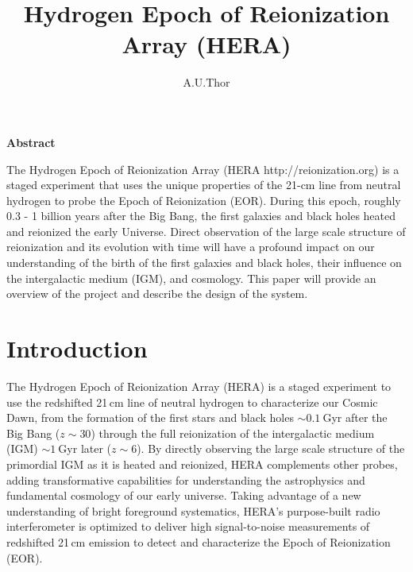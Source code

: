 \documentclass[preprint,11pt]{aastex}
\title{Hydrogen Epoch of Reionization Array (HERA)}
\author{A.U.Thor}
\begin{document}
\maketitle

\begin{center}
\textbf{Abstract}
\end{center}

The Hydrogen Epoch of Reionization Array (HERA http://reionization.org) is a staged experiment that uses the unique properties of the 21-cm line from neutral hydrogen to probe the Epoch of Reionization (EOR). During this epoch, roughly 0.3 - 1 billion years after the Big Bang, the first galaxies and black holes heated and reionized the early Universe. Direct observation of the large scale structure of reionization and its evolution with time will have a profound impact on our understanding of the birth of the first galaxies and black holes, their influence on the intergalactic medium (IGM), and cosmology.  This paper will provide an overview of the project and describe the design of the system.

\section{Introduction}
The Hydrogen Epoch of Reionization Array (HERA) is a staged experiment to use the redshifted 21\,cm line
of neutral hydrogen to characterize our Cosmic Dawn, from
the formation of the first stars and black holes $\sim0.1~$Gyr after the Big
Bang ($z\sim30$) through the full reionization of the intergalactic medium
(IGM) $\sim1~$Gyr later ($z\sim6$).  By directly observing the large scale
structure of the primordial IGM as it is heated and reionized, HERA complements
other probes, adding transformative capabilities for
understanding the astrophysics and fundamental cosmology of our early universe.
Taking advantage of a new understanding of bright foreground systematics, HERA's
purpose-built radio
interferometer is optimized to deliver high signal-to-noise measurements of
redshifted 21\,cm emission to detect and characterize the Epoch of Reionization (EOR).
\end{document}
